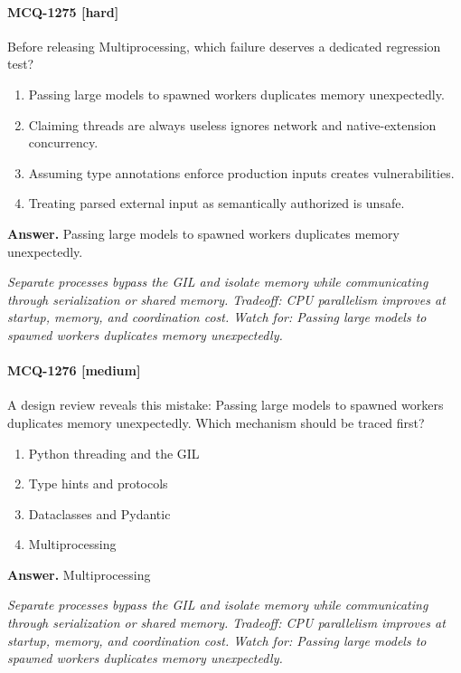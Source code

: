 \paragraph{MCQ-1275 [hard]} Before releasing Multiprocessing, which failure deserves a dedicated regression test?
\begin{enumerate}[label=\Alph*.]
\item Passing large models to spawned workers duplicates memory unexpectedly.
\item Claiming threads are always useless ignores network and native-extension concurrency.
\item Assuming type annotations enforce production inputs creates vulnerabilities.
\item Treating parsed external input as semantically authorized is unsafe.
\end{enumerate}
\noindent\textbf{Answer.} Passing large models to spawned workers duplicates memory unexpectedly.
\par\textit{Separate processes bypass the GIL and isolate memory while communicating through serialization or shared memory. Tradeoff: CPU parallelism improves at startup, memory, and coordination cost. Watch for: Passing large models to spawned workers duplicates memory unexpectedly.}
\paragraph{MCQ-1276 [medium]} A design review reveals this mistake: Passing large models to spawned workers duplicates memory unexpectedly. Which mechanism should be traced first?
\begin{enumerate}[label=\Alph*.]
\item Python threading and the GIL
\item Type hints and protocols
\item Dataclasses and Pydantic
\item Multiprocessing
\end{enumerate}
\noindent\textbf{Answer.} Multiprocessing
\par\textit{Separate processes bypass the GIL and isolate memory while communicating through serialization or shared memory. Tradeoff: CPU parallelism improves at startup, memory, and coordination cost. Watch for: Passing large models to spawned workers duplicates memory unexpectedly.}
